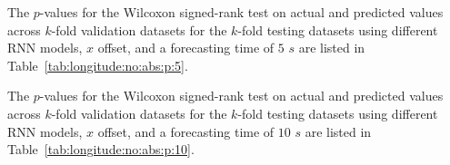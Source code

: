 The $p$-values for the Wilcoxon signed-rank test on actual and predicted values across $k$-fold validation datasets for the $k$-fold testing datasets using different RNN models, $x$ offset, and a forecasting time of $5$ $s$ are listed in Table~\ref{tab:longitude:no:abs:p:5}.

\begin{table}[!ht]
	\centering
	\caption{The $p$-values for the Wilcoxon signed-rank test on actual and predicted values across $k$-fold validation datasets for the $k$-fold testing datasets using different RNN models, $x$ offset, and a forecasting time of $5$ $s$.}
	\label{tab:longitude:no:abs:p:5}
\end{table}

The $p$-values for the Wilcoxon signed-rank test on actual and predicted values across $k$-fold validation datasets for the $k$-fold testing datasets using different RNN models, $x$ offset, and a forecasting time of $10$ $s$ are listed in Table~\ref{tab:longitude:no:abs:p:10}.

